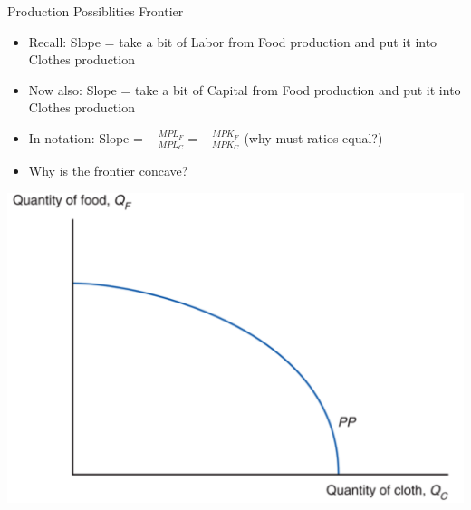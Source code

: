 \documentclass[ignorenonframetext,]{beamer}
\begin{document}
\begin{frame}{Production Possiblities Frontier}

    \begin{itemize}
        \item Recall:   Slope = take a bit of Labor from Food production and put it into Clothes production
        \item Now also: Slope = take a bit of Capital from Food production and put it into Clothes production
        \item In notation: Slope = $-\frac{MPL_F}{MPL_C} = -\frac{MPK_F}{MPK_C}$ (why must ratios equal?)
        \item Why is the frontier concave?
    \end{itemize}
    \includegraphics[scale=0.15]{ppf.png}

\end{frame}
\end{document}
